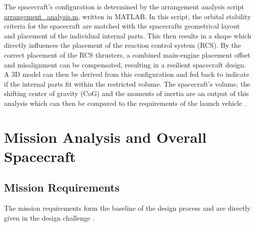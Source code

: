 \documentclass[conference]{IEEEtran}
\begin{document}
The spacecraft's configuration is determined by the arrangement analysis script \href{https://github.com/Sven-J-Steinert/MomenTUM/blob/main/MATLAB/arrangement_analysis.m}{\colorbox{codegray}{arrangement\_analysis.m}}, written in MATLAB. In this script, the orbital stability criteria for the spacecraft are matched with the spacecrafts geometrical layout and placement of the individual internal parts. This then results in a shape which directly influences the placement of the reaction control system (RCS). By the correct placement of the RCS thrusters, a combined main-engine placement offset and misalignment can be compensated, resulting in a resilient spacecraft design. A 3D model can then be derived from this configuration and fed back to indicate if the internal parts fit within the restricted volume. The spacecraft's volume, the shifting center of gravity (CoG) and the moments of inertia are an output of this analysis which can then be compared to the requirements of the launch vehicle \cite{Arianspace.2016}. 

\section{Mission Analysis and Overall Spacecraft}
\subsection{Mission Requirements}

The mission requirements form the baseline of the design process and are directly given in the design challenge \cite{Manfletti.2022}.
\end{document}

